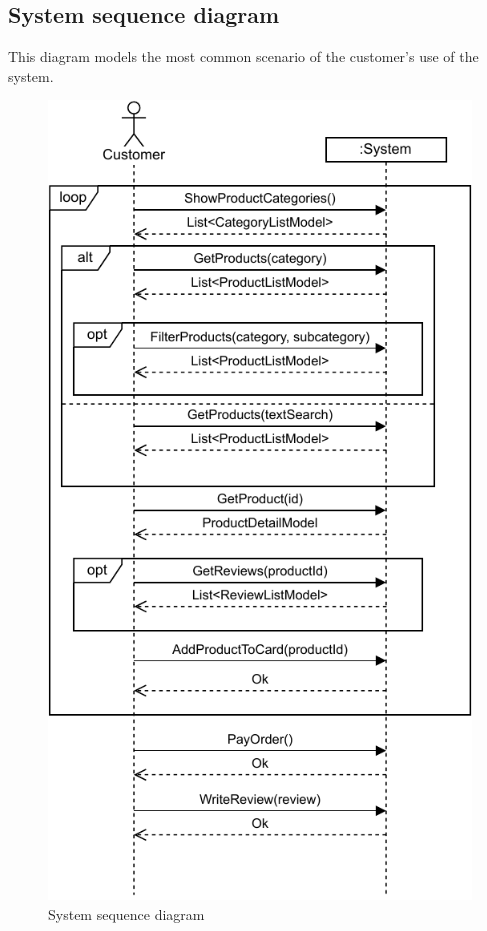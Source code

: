 \documentclass[12pt,english]{article}
\begin{document}
\subsection{System sequence diagram}
This diagram models the most common scenario of the customer's use of the system. 
\begin{figure}[hp]
    \centering
    \includegraphics[scale=1.3]{images/systemSequenceDiagram_buy.pdf}
    \caption{System sequence diagram}
    \label{fig:my_label}
\end{figure}
\end{document}
